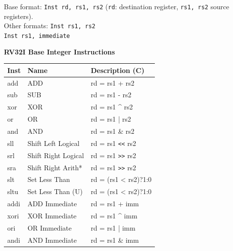 \begin{tabbing}
    Base format: \quad \= \texttt{Inst rd, rs1, rs2} (\texttt{rd}: destination register, \texttt{rs1, rs2} source registers).\\
    Other formats: \> \texttt{Inst rs1, rs2}\\
    \> \texttt{Inst rs1, immediate}
\end{tabbing}

\begin{multicols}{2}
\textbf{RV32I Base Integer Instructions}\\
        \begin{tabular}
        {| T | l | l |} \hline
        \rm Inst & Name                    & \rm Description (C)          \\ \hline
        add      & ADD                     & rd = rs1 + rs2               \\
        sub      & SUB                     & rd = rs1 - rs2               \\
        xor      & XOR                     & rd = rs1 \^{} rs2            \\
        or       & OR                      & rd = rs1 | rs2               \\
        and      & AND                     & rd = rs1 \& rs2              \\
        sll      & Shift Left Logical      & rd = rs1 \verb|<<| rs2       \\
        srl      & Shift Right Logical     & rd = rs1 \verb|>>| rs2       \\
        sra      & Shift Right Arith*      & rd = rs1 \verb|>>| rs2       \\
        slt      & Set Less Than           & rd = (rs1 < rs2)?1:0         \\
        sltu     & Set Less Than (U)       & rd = (rs1 < rs2)?1:0         \\ \hline
        addi     & ADD Immediate           & rd = rs1 + imm               \\
        xori     & XOR Immediate           & rd = rs1 \^{} imm            \\
        ori      & OR Immediate            & rd = rs1 | imm               \\
        andi     & AND Immediate           & rd = rs1 \& imm              \\

\end{tabular}
\end{multicols}
